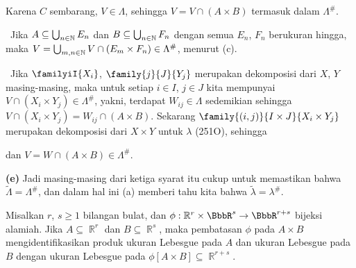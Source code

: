 {\noindent Karena $C$ sembarang, $V\in\Lambda$, sehingga
$V=V\cap(A\times B)$ termasuk dalam $\Lambda^{\#}$.

\medskip

\quad\grheadb\ Jika $A\subseteq\bigcup_{n\in\Bbb N}E_n$ dan
$B\subseteq\bigcup_{n\in\Bbb N}F_n$ dengan semua $E_n$, $F_n$ berukuran
hingga, maka
$V=\bigcup_{m,n\in\Bbb N}V\cap(E_m\times F_n)\in\Lambda^{\#}$, menurut (c).

\medskip

\quad\grheadc\ Jika $\familyiI{X_i}$, $\family{j}{J}{Y_j}$ merupakan
dekomposisi
dari $X$, $Y$ masing-masing, maka untuk setiap $i\in I$, $j\in J$ kita mempunyai
$V\cap(X_i\times Y_j)\in\Lambda^{\#}$, yakni, terdapat
$W_{ij}\in\Lambda$ sedemikian sehingga
$V\cap(X_i\times Y_j)=W_{ij}\cap(A\times B)$.
Sekarang $\family{(i,j)}{I\times J}{X_i\times Y_j}$ merupakan dekomposisi dari
$X\times Y$ untuk $\lambda$ (251O), sehingga


\noindent dan $V=W\cap(A\times B)\in\Lambda^{\#}$.

\medskip

{\bf (e)} Jadi masing-masing dari ketiga syarat itu cukup untuk memastikan bahwa
$\tilde\Lambda=\Lambda^{\#}$, dan dalam hal ini (a) memberi tahu kita bahwa
$\tilde\lambda=\lambda^{\#}$.
}%
 Misalkan $r$, $s\ge 1$ bilangan bulat, dan
$\phi:\Bbb R^r\times\BbbR^s\to\BbbR^{r+s}$ bijeksi alamiah. Jika
$A\subseteq\BbbR^r$ dan $B\subseteq\BbbR^s$, maka pembatasan
$\phi$ pada $A\times B$ mengidentifikasikan produk ukuran Lebesgue pada $A$
dan ukuran Lebesgue pada $B$ dengan ukuran Lebesgue pada $\phi[A\times
B]\subseteq\BbbR^{r+s}$.



